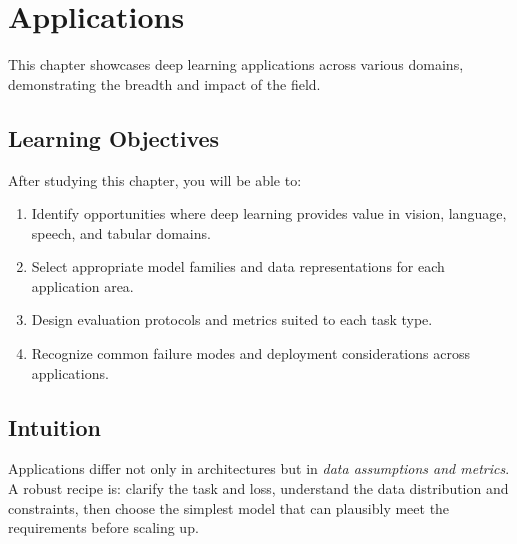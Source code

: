 
\chapter{Applications}
\label{chap:applications}

This chapter showcases deep learning applications across various domains, demonstrating the breadth and impact of the field.


\section*{Learning Objectives}

After studying this chapter, you will be able to:

\begin{enumerate}
    \item Identify opportunities where deep learning provides value in vision, language, speech, and tabular domains.
    \item Select appropriate model families and data representations for each application area.
    \item Design evaluation protocols and metrics suited to each task type.
    \item Recognize common failure modes and deployment considerations across applications.
\end{enumerate}


\section*{Intuition}

Applications differ not only in architectures but in \emph{data assumptions and metrics}. A robust recipe is: clarify the task and loss, understand the data distribution and constraints, then choose the simplest model that can plausibly meet the requirements before scaling up.













